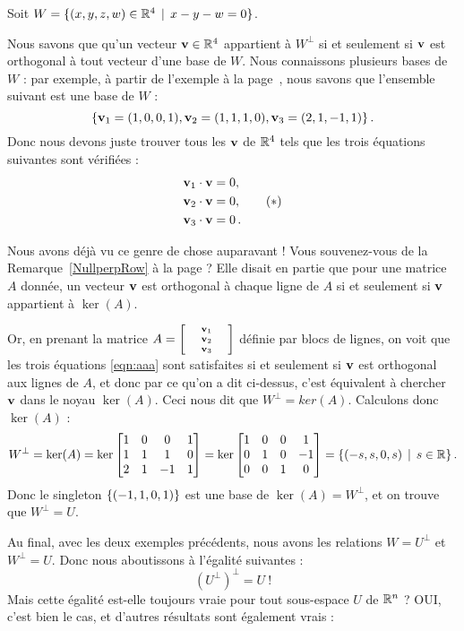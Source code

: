 \begin{myexample}
Soit $W=\{(x,y,z,w)\in \mathbb{R}^4\, \mid \, x - y - w = 0\}$.

Nous savons que qu'un vecteur $\mathbf{v} \in \mathbb{R}^4$ appartient à $W^\perp$ si et seulement si $\mathbf{v}$ est orthogonal à tout vecteur d'une base de $W$. Nous connaissons plusieurs bases de $W$ : par exemple, à partir de l'exemple \`a la page~\pageref{Wagain}, nous savons que l'ensemble suivant est une base de $W$ :
$$ \{\mathbf{v}_1=(1,0,0,1), \mathbf{v}_2=(1,1,1,0), \mathbf{v}_3=(2,1,-1,1)\}\,.$$ 
Donc nous devons juste trouver tous les $\mathbf{v}$ de $\mathbb{R}^4$ tels que les trois équations suivantes sont vérifiées :
\begin{align*}
\notag \mathbf{v}_1\cdot \mathbf{v}&=0,\\
\mathbf{v}_2\cdot \mathbf{v}&=0, \tag{$\ast$}\label{eqn:aaa}\\
\notag \mathbf{v}_3\cdot \mathbf{v}&=0\,.
  \end{align*}

Nous avons déjà vu ce genre de chose auparavant ! Vous souvenez-vous de la Remarque~\ref{NullperpRow} à la page \pageref{NullperpRow} ? Elle disait en partie que pour une matrice $A$ donnée, un vecteur $\mathbf{v}$ est orthogonal à chaque ligne de $A$ si et seulement si $\mathbf{v}$ appartient à $\ker(A)$.

Or, en prenant la matrice $  A=\scriptsize  \bmatrix ~&\vv_1&~\\&\vv_2 \\&\vv_3\endbmatrix$ définie par blocs de lignes, on voit que les trois équations \eqref{eqn:aaa} sont satisfaites si et seulement si $\mathbf{v}$ est orthogonal aux lignes de $A$, et donc par ce qu'on a dit ci-dessus, c'est équivalent à chercher $\mathbf{v}$ dans le noyau $\ker(A)$. Ceci nous dit que $W^\perp = ker(A)$.
Calculons donc $\ker(A)$ :
$$W^\perp = \ker(A)=\ker \bmatrix  1&0&0&1\\1&1&1&0\\2&1&-1&1\endbmatrix =\ker\bmatrix  1 & 0 & 0 & 1 \\
 0 & 1 & 0 & -1 \\
 0 & 0 & 1 & 0 \\\endbmatrix=\set{(-s,s,0,s)\st s\in \R}\,.$$
Donc le singleton $\{(-1,1,0,1)\}$ est une base de $\ker(A)= W^\perp$, et on trouve que $W^\perp = U$.
\end{myexample}

Au final, avec les deux exemples précédents, nous avons les relations $W=U^\perp$ et $W^\perp = U$. Donc nous aboutissons à l'égalité suivantes :
$$(U^\perp)^\perp=U~!$$  
Mais cette égalité est-elle toujours vraie pour tout sous-espace $U$ de $\mathbb{R}^n$ ?
OUI, c'est bien le cas, et d'autres r\'esultats sont également vrais :

